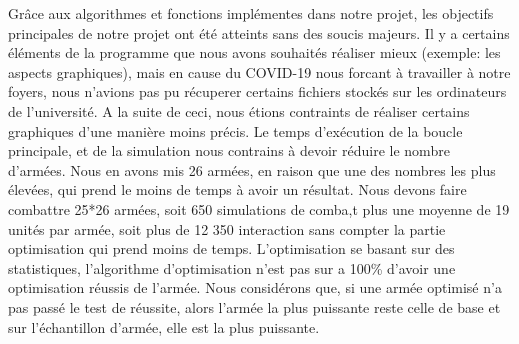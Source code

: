 \documentclass[a4paper, 11pt]{article}
\begin{document}
Grâce aux algorithmes et fonctions implémentes dans notre projet, les objectifs principales de notre projet ont été atteints sans des soucis majeurs. Il y a certains éléments de la programme que nous avons souhaités réaliser mieux (exemple: les aspects graphiques), mais en cause du COVID-19 nous forcant à travailler à notre foyers, nous n'avions pas pu récuperer certains fichiers stockés sur les ordinateurs de l'université. A la suite de ceci, nous étions contraints de réaliser certains graphiques d'une manière moins précis. 
Le temps d’exécution de la boucle principale, et de la simulation nous contrains à devoir réduire le nombre d'armées. Nous en avons mis 26 armées, en raison que une des nombres les plus élevées, qui prend le moins de temps à avoir un résultat. Nous devons faire combattre 25*26 armées, soit 650 simulations de comba,t plus une moyenne de 19 unités par armée, soit plus de 12 350 interaction sans compter la partie optimisation qui prend moins de temps. 
L'optimisation se basant sur des statistiques, l'algorithme d'optimisation n'est pas sur a 100\% d'avoir une optimisation réussis de l'armée. 
Nous considérons que, si une armée optimisé n'a pas passé le test de réussite, alors l'armée la plus puissante reste celle de base et sur l'échantillon d'armée, elle est la plus puissante.\\



\newpage
\end{document}
